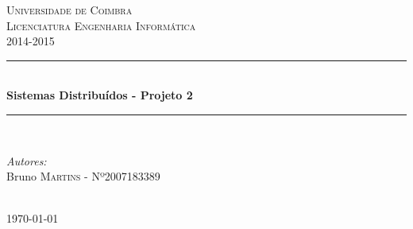 \documentclass[12pt]{article} %
\begin{document}

\begin{titlepage}

\newcommand{\HRule}{\rule{\linewidth}{0.5mm}} %

\center %

\textsc{\LARGE Universidade de Coimbra}\\[1.5cm] %
\textsc{\Large Licenciatura Engenharia Informática\\2014-2015}\\[0.5cm] %

\HRule \\[0.4cm]
{\huge \bfseries Sistemas Distribuídos - Projeto 2}\\[0.4cm] %
\HRule \\[1.5cm]

\begin{minipage}{0.8\textwidth}

\begin{flushleft} \large
\emph{Autores:}\\
Bruno \textsc{Martins} - Nº2007183389
\end{flushleft}

\end{minipage}

\begin{minipage}{0.4\textwidth}
\begin{flushright} \large
\end{flushright}
\end{minipage}\\[4cm]

{\large \today}\\[3cm] %
\vfill %

\end{titlepage}

\tableofcontents %
\end{document}
